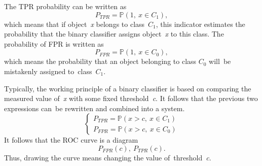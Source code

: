 \documentclass[]{scrreprt}
\begin{document}
%
The TPR probability can be written as
\begin{equation}\label{eq:TPR-probability}
P_{TPR} = \mathbb{P}(1,\ x\in C_{1}),
\end{equation}
which means that if object~\textit{x} belongs to class~$C_{1}$, this indicator estimates the probability that the binary classifier assigns object~\textit{x} to this class. The probability of FPR is written as
\begin{equation}\label{eq:FPR-probability}
P_{FPR} = \mathbb{P}(1,\ x\in C_{0}),
\end{equation}
which means the probability that an object belonging to class $C_0$ will~be mistakenly assigned to~class~$C_1$.

Typically, the working principle of a binary classifier is based on comparing the measured value of~\textit{x} with some fixed threshold~\textit{c}. It follows that the previous two expressions can~be rewritten and combined into a system.
\begin{equation}\label{eq:TRP+FPR-probability}
\begin{cases}
P_{TPR} = \mathbb{P}(x>c,\ x \in C_{1})\\
P_{FPR} = \mathbb{P}(x>c,\ x \in C_{0})
\end{cases}
\end{equation}
It follows that the ROC curve is a diagram
\begin{equation}\label{eq:ROC-contour}
P_{FPR}(c),\ P_{TPR}(c).
\end{equation}
Thus, drawing the curve means changing the value of~threshold~\textit{c}.
\end{document}
